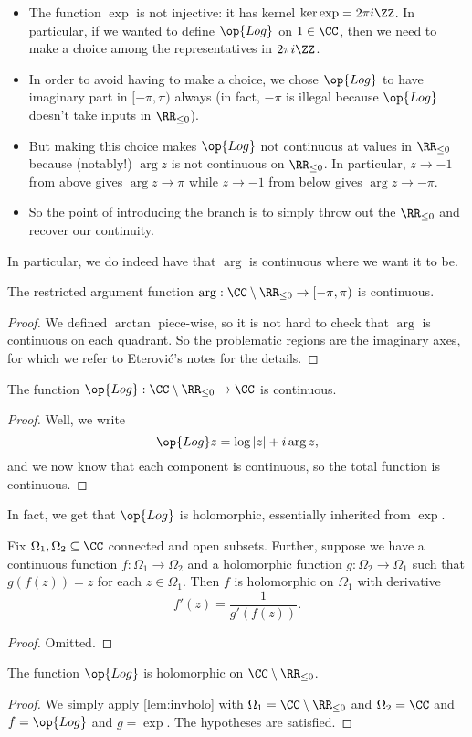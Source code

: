 \begin{itemize}
	\item The function $\exp$ is not injective: it has kernel $\ker\exp=2\pi i\ZZ$. In particular, if we wanted to define $\op{Log}$ on $1\in\CC$, then we need to make a choice among the representatives in $2\pi i\ZZ$.

	\item In order to avoid having to make a choice, we chose $\op{Log}$ to have imaginary part in $[-\pi,\pi)$ always (in fact, $-\pi$ is illegal because $\op{Log}$ doesn't take inputs in $\RR_{\le0}$).
	
	\item But making this choice makes $\op{Log}$ not continuous at values in $\RR_{\le0}$ because (notably!) $\arg z$ is not continuous on $\RR_{\le0}$. In particular, $z\to -1$ from above gives $\arg z\to\pi$ while $z\to-1$ from below gives $\arg z\to-\pi$.

	\item So the point of introducing the branch is to simply throw out the $\RR_{\le0}$ and recover our continuity.
\end{itemize}
In particular, we do indeed have that $\arg$ is continuous where we want it to be.
\begin{lemma}
	The restricted argument function $\arg:\CC\setminus\RR_{\le0}\to[-\pi,\pi)$ is continuous.
\end{lemma}
\begin{proof}
	We defined $\arctan$ piece-wise, so it is not hard to check that $\arg$ is continuous on each quadrant. So the problematic regions are the imaginary axes, for which we refer to Eterovi\'c's notes for the details.
\end{proof}
\begin{corollary}
	The function $\op{Log}:\CC\setminus\RR_{\le0}\to\CC$ is continuous.
\end{corollary}
\begin{proof}
	Well, we write
	\[\op{Log}z=\log|z|+i\arg z,\]
	and we now know that each component is continuous, so the total function is continuous.
\end{proof}
In fact, we get that $\op{Log}$ is holomorphic, essentially inherited from $\exp$.
\begin{lemma} \label{lem:invholo}
	Fix $\Omega_1,\Omega_2\subseteq\CC$ connected and open subsets. Further, suppose we have a continuous function $f:\Omega_1\to\Omega_2$ and a holomorphic function $g:\Omega_2\to\Omega_1$ such that $g(f(z))=z$ for each $z\in\Omega_1$. Then $f$ is holomorphic on $\Omega_1$ with derivative
	\[f'(z)=\frac1{g'(f(z))}.\]
\end{lemma}
\begin{proof}
	Omitted.
\end{proof}
\begin{proposition}
	The function $\op{Log}$ is holomorphic on $\CC\setminus\RR_{\le0}$.
\end{proposition}
\begin{proof}
	We simply apply \autoref{lem:invholo} with $\Omega_1=\CC\setminus\RR_{\le0}$ and $\Omega_2=\CC$ and $f=\op{Log}$ and $g=\exp$. The hypotheses are satisfied.
\end{proof}